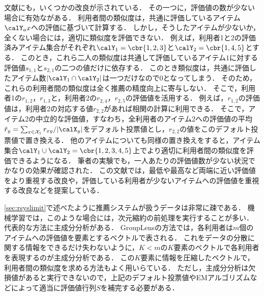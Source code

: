 文献\cite{uai:98:01}にも，いくつかの改良が示されている．
その一つに，評価値の数が少ない場合に有効ながある．
利用者間の類似度は，共通に評価しているアイテム$\calY_ax$への評価に基づいて計算する．
しかし，そうしたアイテムが少ないか，全くない場合には，適切に類似度を評価できない．
例えば，利用者1と2の評価済みアイテム集合がそれぞれ$\calY_1=\cbr{1,2,3}$と$\calY_2=\cbr{1,4,5}$とする．
このとき，これら二人の類似度は共通して評価しているアイテム$1$に対する評価値$s_{1,1}$と$s_{2,1}$の二つの値だけに依存する．
このとき類似度は，共通に評価したアイテム数$|\calY_1\cap \calY_2|$は一つだけなので$0$となってしまう．
そのため，これらの利用者間の類似度は全く推薦の精度向上に寄与しない．
そこで，利用者1の$r_{1,2}$，$r_{1,3}$と，利用者2の$r_{2,4}$，$r_{2,5}$の評価値を活用する．
例えば，$r_{1,2}$の評価値は，利用者2の対応する値$r_{2,2}$があれば相関の計算に利用できる．
そこで，アイテム2の中立的な評価値，すなわち，全利用者のアイテム2への評価値の平均$\tilde{r}_y=\sum_{x\in\cal{X}_y} r_{xy}/|\calX_y|$をデフォルト投票値とし，$r_{2,2}$の値をこのデフォルト投票値で置き換える．
他のアイテムについても同様の置き換えをすると，アイテム集合$\calY_1\cup\calY_2=\cbr{1,2,3,4,5}$上でより適切に利用者間の類似度を評価できるようになる．
筆者の実験でも，一人あたりの評価値数が少ない状況でかなりの効果が確認された．
この文献\cite{uai:98:01}では，最低や最高など両端に近い評価値をより重視する改良や，評価している利用者が少ないアイテムへの評価値を重視する改良などを提案している．

\ref{sec:rsyslimit}で述べたように推薦システムが扱うデータは非常に疎である．
機械学習では，このような場合には，次元縮約の前処理を実行することが多い．
代表的な方法に主成分分析\cite{eb:053:00,jpublist:077x,jb:021:00}がある．
GroupLensの方法では，各利用者は$m$個のアイテムへの評価値を要素とするベクトルで表される．
これをデータの分散に関する情報をできるだけ失わないように，$K< m$の$K$要素のベクトルで各利用者を表現するのが主成分分析である．
この$K$要素に情報を圧縮したベクトルで，利用者間の類似度を求める方法もよく用いらている\cite{ec:007,sigir:06:01}．
ただし，主成分分析は欠損値があると実行できないので，上記のデフォルト投票値やEMアルゴリズムなどによって適当に評価値行列$S$を補完する必要がある．

